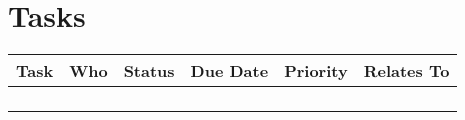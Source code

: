 \documentclass[qipps.tex]{subfiles}
\begin{document}
\section{Tasks}
\ifdraft{

}{}
\begin{tabu} to 170mm {|X[1,l]|X[1,l]|X[0.5,c]|X[0.5,l]|X[0.5,l]|X[1,l]|} \hline
Task & Who & Status & Due Date & Priority & Relates To \\ \hline
   &   &   &   &   &   \\ \hline
   &   &   &   &   &   \\ \hline
   &   &   &   &   &   \\ \hline
   &   &   &   &   &   \\ \hline
\end{tabu}
\end{document}

